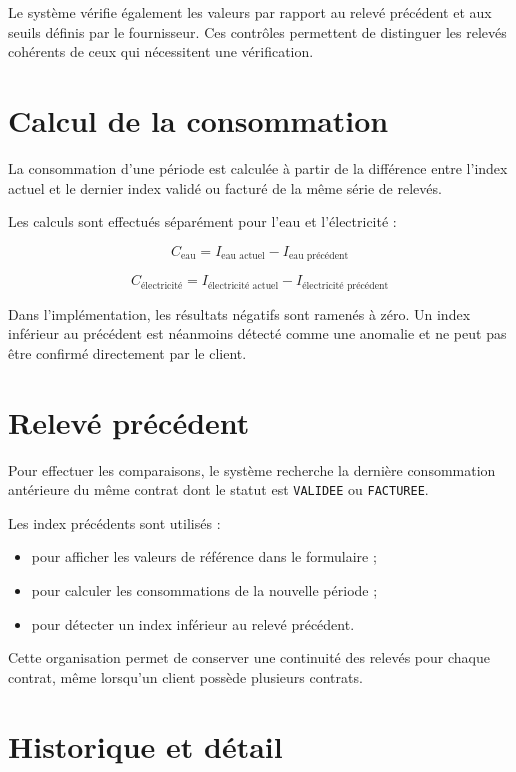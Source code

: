 Le système vérifie également les valeurs par rapport au relevé précédent et aux seuils définis par le fournisseur. Ces contrôles permettent de distinguer les relevés cohérents de ceux qui nécessitent une vérification.

\section{Calcul de la consommation}

La consommation d'une période est calculée à partir de la différence entre l'index actuel et le dernier index validé ou facturé de la même série de relevés.

Les calculs sont effectués séparément pour l'eau et l'électricité :

\[
C_{\text{eau}} =
I_{\text{eau actuel}} - I_{\text{eau précédent}}
\]

\[
C_{\text{électricité}} =
I_{\text{électricité actuel}} - I_{\text{électricité précédent}}
\]

Dans l'implémentation, les résultats négatifs sont ramenés à zéro. Un index inférieur au précédent est néanmoins détecté comme une anomalie et ne peut pas être confirmé directement par le client.

\section{Relevé précédent}

Pour effectuer les comparaisons, le système recherche la dernière consommation antérieure du même contrat dont le statut est \texttt{VALIDEE} ou \texttt{FACTUREE}.

Les index précédents sont utilisés :
\begin{itemize}
    \item pour afficher les valeurs de référence dans le formulaire ;
    \item pour calculer les consommations de la nouvelle période ;
    \item pour détecter un index inférieur au relevé précédent.
\end{itemize}

Cette organisation permet de conserver une continuité des relevés pour chaque contrat, même lorsqu'un client possède plusieurs contrats.

\section{Historique et détail}

